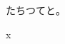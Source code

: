 \documentclass[pdflatex]{jlreq}
\begin{document}
\makeatletter
\def\ptj@par@verifywd{1}%
\hsize=70pt
\begin{ptjparagraph}
たちつてと。
\end{ptjparagraph}
\makeatother
x
\end{document}
